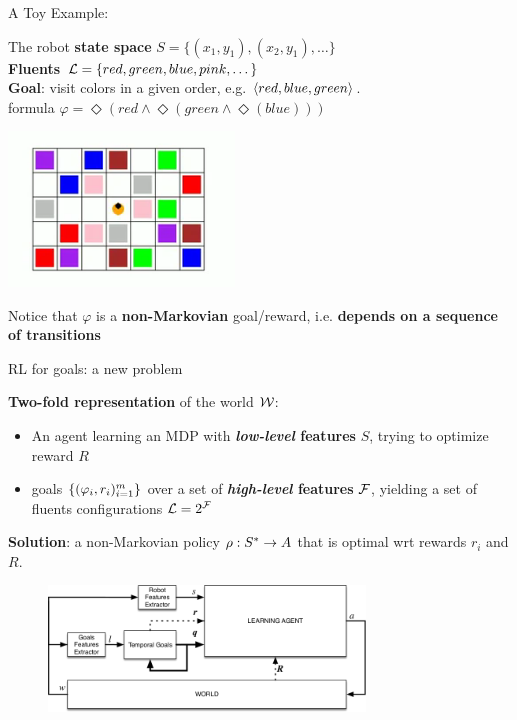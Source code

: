 \documentclass{beamer}
\begin{document}
\begin{frame}{A Toy Example: \Sapientino}
	
	The robot \textbf{state space} $S = \{(x_1, y_1), (x_2, y_1), \dots\}$\\
	\textbf{Fluents} $\mathcal{L} = \{red, green, blue, pink,\dots\}$\\
	\textbf{Goal}: visit colors in a given order, e.g. $\langle red, blue, green \rangle$.\\
	\LTLf formula $\varphi = \Diamond (red \land \Diamond (green \land \Diamond(blue)))$
	\begin{center}
	\includegraphics[width=0.45\textwidth]{images/sapientino-start}
	\end{center}
	
	Notice that $\varphi$ is a \textbf{non-Markovian} goal/reward, i.e. \textbf{depends on a sequence of transitions}
	
\end{frame}



\begin{frame}{RL for \LLf goals: a new problem}
	
	\textbf{Two-fold representation} of the world $\mathcal{W}$:
	\begin{itemize}
		\item An agent learning an MDP with \textbf{\emph{low-level} features} $S$, trying to optimize reward $R$
		\item \LLf goals $\{(\varphi_i, r_i)_{i=1}^m\}$ over a set of \textbf{\emph{high-level} features} $\mathcal{F}$, yielding a set of fluents configurations $\mathcal{L} = 2^{\mathcal{F}}$
	\end{itemize}
	
	\textbf{Solution}: a non-Markovian policy $\rho: S^*\to A$ that is optimal wrt rewards $r_i$ and $R$.
	
	\begin{figure}
		\includegraphics[width=0.75\textwidth]{images/rl-two-representations-no-borders}
	\end{figure}
	
	
\end{frame}
\end{document}
